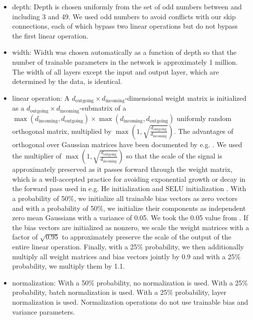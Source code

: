 \documentclass{article} %
\begin{document}
\begin{itemize}
\item depth: Depth is chosen uniformly from the set of odd numbers between and including 3 and 49. We used odd numbers to avoid conflicts with our skip connections, each of which bypass two linear operations but do not bypass the first linear operation.
\item width: Width was chosen automatically as a function of depth so that the number of trainable parameters in the network is approximately 1 million. The width of all layers except the input and output layer, which are determined by the data, is identical.
\item linear operation: A $d_\text{outgoing} \times d_\text{incoming}$-dimensional weight matrix is initialized as a $d_\text{outgoing} \times d_\text{incoming}$-submatrix of a $\max(d_\text{incoming},d_\text{outgoing}) \times \max(d_\text{incoming},d_\text{outgoing})$ uniformly random orthogonal matrix, multiplied by $\max(1,\sqrt{\frac{d_\text{outgoing}}{d_\text{incoming}}})$. The advantages of orthogonal over Gaussian matrices have been documented by e.g. \citet{orthogonalInitialization,eigenspectrumGram,orthRNN,fastfoodUnitaryRNN,meanFieldCNN,eigenspectrum}. We used the multiplier of $\max(1,\sqrt{\frac{d_\text{outgoing}}{d_\text{incoming}}})$ so that the scale of the signal is approximately preserved as it passes forward through the weight matrix, which is a well-accepted practice for avoiding exponential growth or decay in the forward pass used in e.g. He initialization \citep{heInit} and SELU initialization \citep{selu}. With a probability of 50\%, we initialize all trainable bias vectors as zero vectors and with a probability of 50\%, we initialize their components as independent zero mean Gaussians with a variance of 0.05. We took the 0.05 value from \citet{depthScalesMeanField}. If the bias vectors are initialized as nonzero, we scale the weight matrices with a factor of $\sqrt{0.95}$ to approximately preserve the scale of the output of the entire linear operation. Finally, with a 25\% probability, we then additionally multiply all weight matrices and bias vectors jointly by 0.9 and with a 25\% probability, we multiply them by 1.1.
\item normalization: With a 50\% probability, no normalization is used. With a 25\% probability, batch normalization \citep{batchNormalization} is used. With a 25\% probability, layer normalization \citep{layerNormalization} is used. Normalization operations do not use trainable bias and variance parameters.

\end{itemize}
\end{document}
